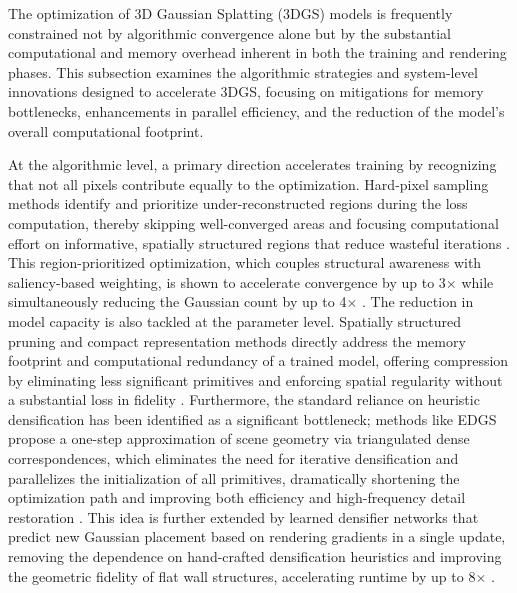 \documentclass[11pt,a4paper]{article}
\begin{document}
The optimization of 3D Gaussian Splatting (3DGS) models is frequently constrained not by algorithmic convergence alone but by the substantial computational and memory overhead inherent in both the training and rendering phases. This subsection examines the algorithmic strategies and system-level innovations designed to accelerate 3DGS, focusing on mitigations for memory bottlenecks, enhancements in parallel efficiency, and the reduction of the model's overall computational footprint.

At the algorithmic level, a primary direction accelerates training by recognizing that not all pixels contribute equally to the optimization. Hard-pixel sampling methods identify and prioritize under-reconstructed regions during the loss computation, thereby skipping well-converged areas and focusing computational effort on informative, spatially structured regions that reduce wasteful iterations \cite{arxiv:2411.12788v2}. This region-prioritized optimization, which couples structural awareness with saliency-based weighting, is shown to accelerate convergence by up to 3$\times$ while simultaneously reducing the Gaussian count by up to 4$\times$ \cite{arxiv:2411.12788v2}. The reduction in model capacity is also tackled at the parameter level. Spatially structured pruning and compact representation methods directly address the memory footprint and computational redundancy of a trained model, offering compression by eliminating less significant primitives and enforcing spatial regularity without a substantial loss in fidelity \cite{arxiv:2411.12788v2}. Furthermore, the standard reliance on heuristic densification has been identified as a significant bottleneck; methods like EDGS propose a one-step approximation of scene geometry via triangulated dense correspondences, which eliminates the need for iterative densification and parallelizes the initialization of all primitives, dramatically shortening the optimization path and improving both efficiency and high-frequency detail restoration \cite{arxiv:2504.13204v2}. This idea is further extended by learned densifier networks that predict new Gaussian placement based on rendering gradients in a single update, removing the dependence on hand-crafted densification heuristics and improving the geometric fidelity of flat wall structures, accelerating runtime by up to 8$\times$ \cite{arxiv:2505.05591v2}.
\end{document}
